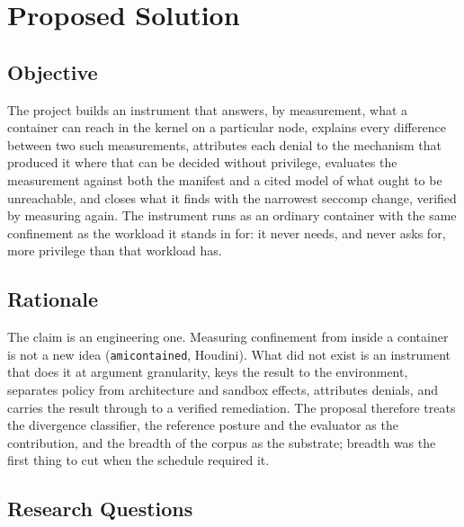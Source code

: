 \chapter{Proposed Solution}
\label{ch:proposed}

\section{Objective}

The project builds an instrument that answers, by measurement, what a container can reach in the kernel on a particular node, explains every difference between two such measurements, attributes each denial to the mechanism that produced it where that can be decided without privilege, evaluates the measurement against both the manifest and a cited model of what ought to be unreachable, and closes what it finds with the narrowest seccomp change, verified by measuring again. The instrument runs as an ordinary container with the same confinement as the workload it stands in for: it never needs, and never asks for, more privilege than that workload has.

\section{Rationale}

The claim is an engineering one. Measuring confinement from inside a container is not a new idea (\texttt{amicontained}, Houdini). What did not exist is an instrument that does it at argument granularity, keys the result to the environment, separates policy from architecture and sandbox effects, attributes denials, and carries the result through to a verified remediation. The proposal therefore treats the divergence classifier, the reference posture and the evaluator as the contribution, and the breadth of the corpus as the substrate; breadth was the first thing to cut when the schedule required it.

\section{Research Questions}


